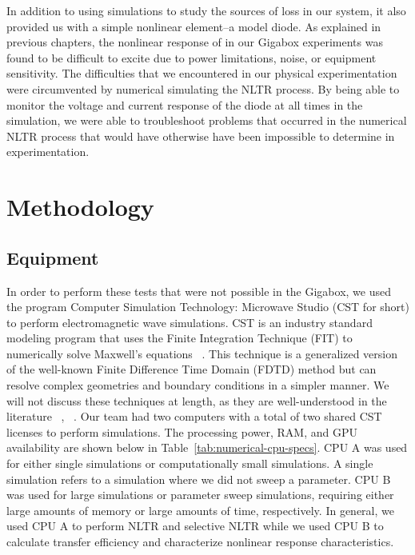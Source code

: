 In addition to using simulations to study the sources of loss in our system, it also provided us with a simple nonlinear element--a model diode. As explained in previous chapters, the nonlinear response of in our Gigabox experiments was found to be difficult to excite due to power limitations, noise, or equipment sensitivity. The difficulties that we encountered in our physical experimentation were circumvented by numerical simulating the NLTR process. By being able to monitor the voltage and current response of the diode at all times in the simulation, we were able to troubleshoot problems that occurred in the numerical NLTR process that would have otherwise have been impossible to determine in experimentation.

\section{Methodology}
\label{sec:numerical-meth}

\subsection{Equipment}
In order to perform these tests that were not possible in the Gigabox, we used the program Computer Simulation Technology: Microwave Studio (CST for short) to perform electromagnetic wave simulations. CST is an industry standard modeling program that uses the Finite Integration Technique (FIT) to numerically solve Maxwell's equations ~\cite{computersimulationtechnology}. This technique is a generalized version of the well-known Finite Difference Time Domain (FDTD) method but can resolve complex geometries and boundary conditions in a simpler manner. We will not discuss these techniques at length, as they are well-understood in the literature ~\cite{schneider2010understanding}, ~\cite{weiland2001discrete}.
Our team had two computers with a total of two shared CST licenses to perform simulations. The processing power, RAM, and GPU availability are shown below in Table~\ref{tab:numerical-cpu-specs}. CPU A was used for either single simulations or computationally small simulations. A single simulation refers to a simulation where we did not sweep a parameter. CPU B was used for large simulations or parameter sweep simulations, requiring either large amounts of memory or large amounts of time, respectively. In general, we used CPU A to perform NLTR and selective NLTR while we used CPU B to calculate transfer efficiency and characterize nonlinear response characteristics.

